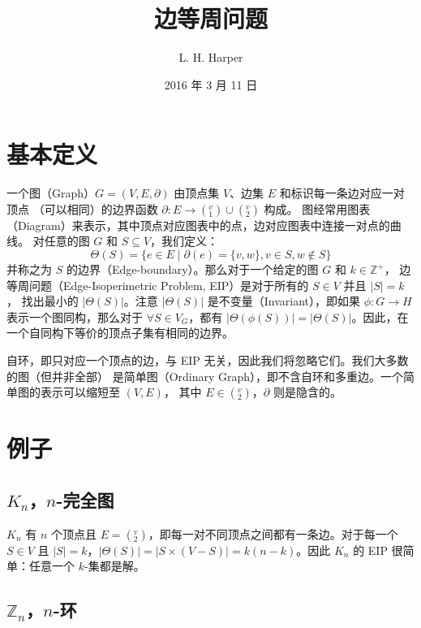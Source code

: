 \documentclass[12pt, a4paper]{article}
\author{L. H. Harper}
\date{2016 年 3 月 11 日}
\begin{document}
\title{边等周问题}
\maketitle

\section{基本定义}
\label{Section 1}

一个图（Graph）$G = (V, E, \partial)$ 由顶点集 $V$、边集 $E$ 和标识每一条边对应一对顶点
（可以相同）的边界函数 $\partial \colon E \rightarrow (_1^v) \cup (_2^v)$ 构成。
图经常用图表（Diagram）来表示，其中顶点对应图表中的点，边对应图表中连接一对点的曲线。
对任意的图 $G$ 和 $S \subseteq V$，我们定义：
\begin{equation*}
\Theta(S) = \{e \in E \mid \partial(e) = \{v, w\}, v \in S, w \notin S\}
\end{equation*}
并称之为 $S$ 的边界（Edge-boundary）。那么对于一个给定的图 $G$ 和 $k \in \mathbb{Z}^+$，
边等周问题（Edge-Isoperimetric Problem, EIP）是对于所有的 $S \in V$ 并且 $|S| = k$，
找出最小的 $|\Theta(S)|$。注意 $|\Theta(S)|$ 是不变量（Invariant），即如果
$\phi \colon G \rightarrow H$ 表示一个图同构，那么对于 $\forall S \in V_G$，都有
$|\Theta(\phi(S))| = |\Theta(S)|$。因此，在一个自同构下等价的顶点子集有相同的边界。

自环，即只对应一个顶点的边，与 EIP 无关，因此我们将忽略它们。我们大多数的图（但并非全部）
是简单图（Ordinary Graph），即不含自环和多重边。一个简单图的表示可以缩短至 $(V, E)$，
其中 $E \in (_2^v)$，$\partial$ 则是隐含的。

\section{例子}
\label{Section 2}

\subsection{$K_n$，$n$-完全图}
\label{Subsection 2.1}

$K_n$ 有 $n$ 个顶点且 $E = (_2^v)$，即每一对不同顶点之间都有一条边。对于每一个 $S \in V$
且 $|S| = k$，$|\Theta(S)| = |S \times (V − S)| = k(n − k)$。因此 $K_n$ 的 EIP
很简单：任意一个 $k$-集都是解。

\subsection{$\mathbb{Z}_n$，$n$-环}
\label{Subsection 2.2}
\end{document}
